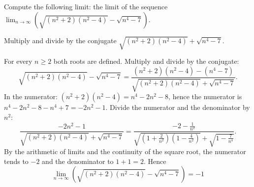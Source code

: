 
\begin{question}
Compute the following limit:
the limit of the sequence $\displaystyle\lim_{n\to\infty}\left(\sqrt{(n^2+2)(n^2-4)}-\sqrt{n^4-7}\right)$.
\end{question}

\begin{hint}
Multiply and divide by the conjugate $\sqrt{(n^2+2)(n^2-4)}+\sqrt{n^4-7}$.
\end{hint}

\begin{solution}
For every $n\ge2$ both roots are defined. Multiply and divide by the conjugate:
\[ \sqrt{(n^2+2)(n^2-4)}-\sqrt{n^4-7}=\frac{(n^2+2)(n^2-4)-(n^4-7)}{\sqrt{(n^2+2)(n^2-4)}+\sqrt{n^4-7}}. \]
In the numerator: $(n^2+2)(n^2-4)=n^4-2n^2-8$, hence the numerator is $n^4-2n^2-8-n^4+7=-2n^2-1$. Divide the numerator and the denominator by $n^2$:
\[ \frac{-2n^2-1}{\sqrt{(n^2+2)(n^2-4)}+\sqrt{n^4-7}}=\frac{-2-\frac1{n^2}}{\sqrt{\left(1+\frac2{n^2}\right)\left(1-\frac4{n^2}\right)}+\sqrt{1-\frac7{n^4}}}. \]
By the arithmetic of limits and the continuity of the square root, the numerator tends to $-2$ and the denominator to $1+1=2$. Hence
\[ \boxed{\lim_{n\to\infty}\left(\sqrt{(n^2+2)(n^2-4)}-\sqrt{n^4-7}\right)=-1} \]
\end{solution}
